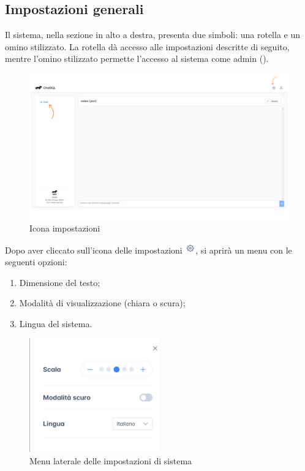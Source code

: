 \subsection{Impostazioni generali}

\par Il sistema, nella sezione in alto a destra, presenta due simboli: una rotella e un omino stilizzato. La rotella dà accesso alle impostazioni descritte di seguito, mentre l'omino stilizzato permette l'accesso al sistema come admin ().

\begin{figure}[H]
  \centering
  \includegraphics[width=\textwidth]{assets/chat_generale.png}
  \caption{Icona impostazioni}
\end{figure}

\par Dopo aver cliccato sull'icona delle impostazioni \includegraphics[height=1.2em]{assets/settings_icon.png}, si aprirà un menu con le seguenti opzioni:
\begin{enumerate}
    \item Dimensione del testo;
    \item Modalità di visualizzazione (chiara o scura);
    \item Lingua del sistema.
\end{enumerate}

\begin{figure}[H]
  \centering
  \includegraphics[width=0.50\textwidth]{assets/menu_config.png}
  \caption{Menu laterale delle impostazioni di sistema}
\end{figure}

